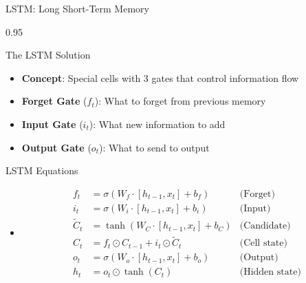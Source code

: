 \documentclass[9pt, aspectratio=169, t]{beamer}
\begin{document}
\begin{frame}{LSTM: Long Short-Term Memory}
    \begin{cminipage}{0.95\textwidth}
    \vspace{-0.2cm}
    {\small
    \begin{block}{The LSTM Solution}
        \begin{itemize}\setlength{\itemsep}{0pt}
            \item \textbf{Concept}: Special cells with 3 gates that control information flow
            \item \textbf{Forget Gate} ($f_t$): What to forget from previous memory
            \item \textbf{Input Gate} ($i_t$): What new information to add
            \item \textbf{Output Gate} ($o_t$): What to send to output
        \end{itemize}
    \end{block}

    \vspace{-0.05cm}

    \begin{block}{LSTM Equations}
        \begin{itemize}\setlength{\itemsep}{0pt}
        \item {\footnotesize
        \begin{align*}
            f_t &= \sigma(W_f \cdot [h_{t-1}, x_t] + b_f) & \text{(Forget)} \\
            i_t &= \sigma(W_i \cdot [h_{t-1}, x_t] + b_i) & \text{(Input)} \\
            \tilde{C}_t &= \tanh(W_C \cdot [h_{t-1}, x_t] + b_C) & \text{(Candidate)} \\
            C_t &= f_t \odot C_{t-1} + i_t \odot \tilde{C}_t & \text{(Cell state)} \\
            o_t &= \sigma(W_o \cdot [h_{t-1}, x_t] + b_o) & \text{(Output)} \\
            h_t &= o_t \odot \tanh(C_t) & \text{(Hidden state)}
        \end{align*}
        }
        \end{itemize}
    \end{block}
    }
    \end{cminipage}
\end{frame}
\end{document}
